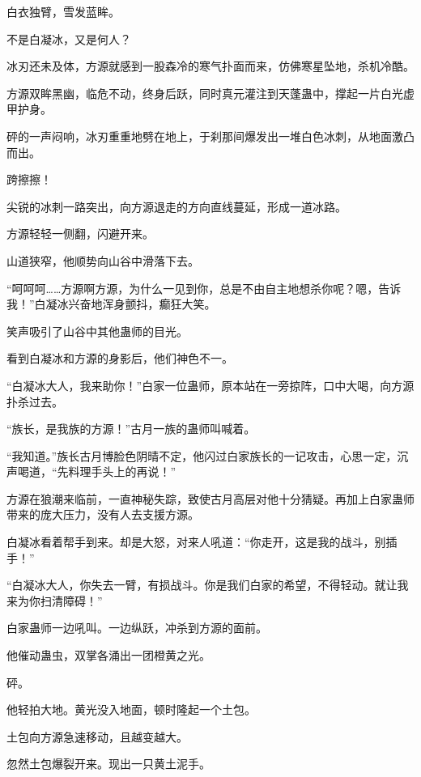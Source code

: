 
\begin{this_body}



白衣独臂，雪发蓝眸。

不是白凝冰，又是何人？

冰刃还未及体，方源就感到一股森冷的寒气扑面而来，仿佛寒星坠地，杀机冷酷。

方源双眸黑幽，临危不动，终身后跃，同时真元灌注到天蓬蛊中，撑起一片白光虚甲护身。

砰的一声闷响，冰刃重重地劈在地上，于刹那间爆发出一堆白色冰刺，从地面激凸而出。

跨擦擦！

尖锐的冰刺一路突出，向方源退走的方向直线蔓延，形成一道冰路。

方源轻轻一侧翻，闪避开来。

山道狭窄，他顺势向山谷中滑落下去。

“呵呵呵……方源啊方源，为什么一见到你，总是不由自主地想杀你呢？嗯，告诉我！”白凝冰兴奋地浑身颤抖，癫狂大笑。

笑声吸引了山谷中其他蛊师的目光。

看到白凝冰和方源的身影后，他们神色不一。

“白凝冰大人，我来助你！”白家一位蛊师，原本站在一旁掠阵，口中大喝，向方源扑杀过去。

“族长，是我族的方源！”古月一族的蛊师叫喊着。

“我知道。”族长古月博脸色阴晴不定，他闪过白家族长的一记攻击，心思一定，沉声喝道，“先料理手头上的再说！”

方源在狼潮来临前，一直神秘失踪，致使古月高层对他十分猜疑。再加上白家蛊师带来的庞大压力，没有人去支援方源。

白凝冰看着帮手到来。却是大怒，对来人吼道：“你走开，这是我的战斗，别插手！”

“白凝冰大人，你失去一臂，有损战斗。你是我们白家的希望，不得轻动。就让我来为你扫清障碍！”

白家蛊师一边吼叫。一边纵跃，冲杀到方源的面前。

他催动蛊虫，双掌各涌出一团橙黄之光。

砰。

他轻拍大地。黄光没入地面，顿时隆起一个土包。

土包向方源急速移动，且越变越大。

忽然土包爆裂开来。现出一只黄土泥手。


\end{this_body}
